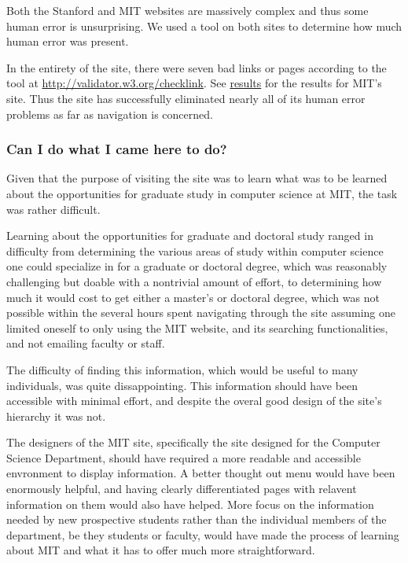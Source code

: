 Both the Stanford and MIT websites are massively complex and thus some human error is unsurprising.
We used a tool on both sites to determine how much human error was present.

In the entirety of the site, there were seven bad links or pages according to the tool at
\url{http://validator.w3.org/checklink}. See
\href{http://validator.w3.org/checklink?uri=mit.edu&hide_type=all&depth=&check=Check#results1}{results}
for the results for MIT's site. Thus the site has successfully eliminated nearly all of its
human error problems as far as navigation is concerned.

\subsubsection*{Can I do what I came here to do?}

Given that the purpose of visiting the site was to learn what was to be learned about the
opportunities for graduate study in computer science at MIT, the task was rather difficult.

Learning about the opportunities for graduate and doctoral study ranged in difficulty from
determining the various areas of study within computer science one could specialize in
for a graduate or doctoral degree, which was reasonably challenging but doable with a
nontrivial amount of effort, to determining how much it would cost to get either a master's
or doctoral degree, which was not possible within the several hours spent navigating through
the site assuming one limited oneself to only using the MIT website, and its searching
functionalities, and not emailing faculty or staff.

The difficulty of finding this information, which would be useful to many individuals, was
quite dissappointing. This information should have been accessible with minimal effort, and
despite the overal good design of the site's hierarchy it was not.

The designers of the MIT site, specifically the site designed for the Computer Science Department,
should have required a more readable and accessible envronment to display information. A better
thought out menu would have been enormously helpful, and having clearly differentiated pages with
relavent information on them would also have helped. More focus on the information needed by new 
prospective students rather than the individual members of the department, be they students or 
faculty, would have made the process of learning about MIT and what it has to offer much more 
straightforward.

